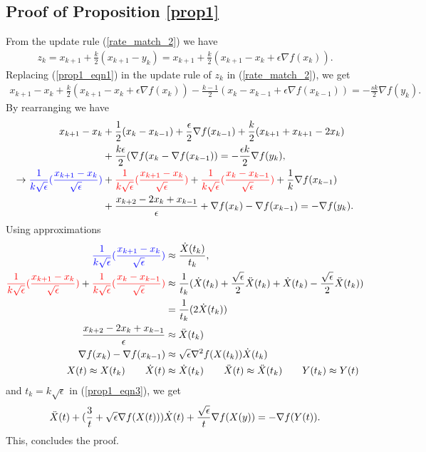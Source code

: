 \documentclass{article}
\theoremstyle{plain}
\theoremstyle{definition}
\theoremstyle{remark}
\begin{document}
\subsection{Proof of Proposition \ref{prop1}}\label{proof_prop1}
    From the update rule (\ref{rate_match_2}) we have
    \begin{align}\label{prop1_eqn1}
        z_k = x_{k+1}+\frac{k}{2}(x_{k+1}-y_k)=x_{k+1}+\frac{k}{2}(x_{k+1}-x_k+\epsilon \nabla f(x_k)).
    \end{align}
    Replacing (\ref{prop1_eqn1}) in the update rule of $z_k$ in (\ref{rate_match_2}), we get
    \begin{align}\label{prop1_eqn2}
        x_{k+1}-x_k+\frac{k}{2}(x_{k+1}-x_k+\epsilon\nabla f(x_k))-\frac{k-1}{2}(x_k-x_{k-1}+\epsilon \nabla f(x_{k-1}))=-\frac{sk}{2}\nabla f(y_k).
    \end{align}
    By rearranging we have
      \begin{align}\label{prop1_eqn3}
        x_{k+1}-x_k&+\frac{1}{2}(x_{k}-x_{k-1})+\frac{\epsilon}{2}\nabla f(x_{k-1})+\frac{k}{2}(x_{k+1}+x_{k+1}-2x_k)\nonumber\\
        &+\frac{k\epsilon}{2}(\nabla f(x_{k}- \nabla f(x_{k-1}))=-\frac{\epsilon k}{2}\nabla f(y_k),\nonumber\\
        \rightarrow \color{blue}\frac{1}{k\sqrt{\epsilon}}(\frac{x_{k+1}-x_k}{\sqrt{\epsilon}})\color{black}&+\color{red}\frac{1}{k\sqrt{\epsilon}}(\frac{x_{k+1}-x_k}{\sqrt{\epsilon}})\color{black}+\color{red}\frac{1}{k\sqrt{\epsilon}}(\frac{x_k-x_{k-1}}{\sqrt{\epsilon}})\color{black} +\frac{1}{k}\nabla f(x_{k-1}) \nonumber\\
        & +\frac{x_{k+2}-2x_k+x_{k-1}}{\epsilon}+\nabla f(x_k)-\nabla f(x_{k-1})=-\nabla f(y_k).
    \end{align}
    Using approximations
    \begin{align}\label{prop1_eqn4}
        \color{blue}\frac{1}{k\sqrt{\epsilon}}(\frac{x_{k+1}-x_k}{\sqrt{\epsilon}})&\approx \frac{\dot X(t_k)}{t_k},\\
        \color{red}\frac{1}{k\sqrt{\epsilon}}(\frac{x_{k+1}-x_k}{\sqrt{\epsilon}})\color{black}+\color{red}\frac{1}{k\sqrt{\epsilon}}(\frac{x_k-x_{k-1}}{\sqrt{\epsilon}})&\approx \frac{1}{t_k}(\dot X(t_k)+\frac{\sqrt{\epsilon}}{2}\Ddot{X}(t_k)+ \dot X(t_k)-\frac{\sqrt{\epsilon}}{2}\Ddot{X}(t_k))\nonumber\\
        &=\frac{1}{t_k}(2 \dot X(t_k))\\
        \frac{x_{k+2}-2x_k+x_{k-1}}{\epsilon}&\approx \Ddot{X}(t_k)\\
        \nabla f(x_k)-\nabla f(x_{k-1})&\approx \sqrt{\epsilon}\nabla^2 f(X(t_k))\dot X(t_k)\\
        X(t)\approx X(t_k)\qquad \dot X(t)&\approx\dot X(t_k)\qquad \Ddot X(t)\approx\Ddot X(t_k) \qquad Y(t_k)\approx Y(t)
    \end{align}
    and $t_k=k\sqrt{\epsilon}$ in (\ref{prop1_eqn3}), we get
\begin{align}\label{prop1_eqn5}
    \Ddot{X}(t)+(\frac{3}{t}+\sqrt{\epsilon}\nabla f(X(t)))\dot X(t)+\frac{\sqrt{\epsilon}}{t}\nabla f(X(y))=-\nabla f(Y(t)).
\end{align}
This, concludes the proof.
\end{document}
